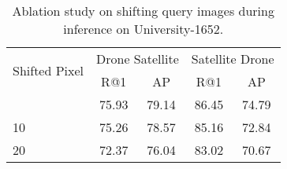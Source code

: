 \documentclass[journal]{IEEEtran}
\begin{document}
\setlength{\tabcolsep}{10pt}
\begin{table}
\small
\caption{Ablation study on shifting query images during inference on University-1652.
}
\begin{center}
\begin{tabular}{l|cc|cc}
\hline
\multirow{2}{*}{Shifted Pixel}& \multicolumn{2}{c|}{Drone  Satellite} & \multicolumn{2}{c}{Satellite  Drone}\\
  & R@1 & AP & R@1 & AP\\
\shline
0 & 75.93 & 79.14 & 86.45 & 74.79 \\
10 & 75.26 & 78.57 & 85.16 & 72.84 \\
20 & 72.37 & 76.04 & 83.02 & 70.67 \\
\hline
\end{tabular}
\end{center}
\label{table:shift}
\end{table}
\end{document}
